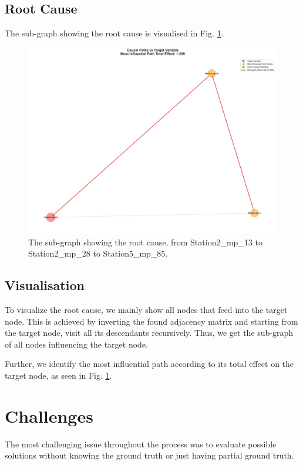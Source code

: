 \documentclass{article}
\begin{document}
    \subsection{Root Cause}
    
    The sub-graph showing the root cause is visualised in Fig. \ref{fig:subgraph}.
    \begin{figure}
        \centering
        \includegraphics[width=0.75\linewidth]{subgraph_result.jpeg}
        \caption{The sub-graph showing the root cause, from Station2\_mp\_13 to Station2\_mp\_28 to Station5\_mp\_85.}
        \label{fig:subgraph}
    \end{figure}
    
    \subsection{Visualisation}

    To visualize the root cause, we mainly show all nodes that feed into the target node. This is achieved by inverting the found adjacency matrix and starting from the target node, visit all its descendants recursively. Thus, we get the sub-graph of all nodes influencing the target node. 

    Further, we identify the most influential path according to its total effect on the target node, as seen in Fig. \ref{fig:subgraph}.
    
    
    \section{Challenges} %
    The most challenging issue throughout the process was to evaluate possible solutions without knowing the ground truth or just having partial ground truth.


	
	
	
	
	
	
	
	
	
	\printbibliography %
	
	
\end{document}

